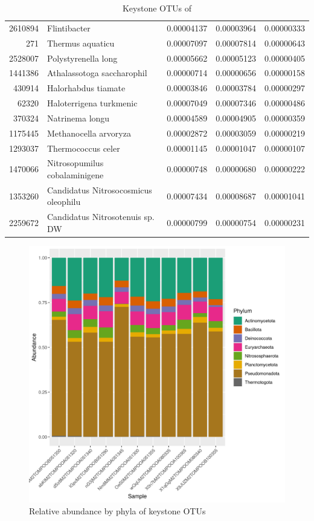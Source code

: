 \begin{table}[ht]
\begin{tabular}{rlrrr}
  2610894 & Flintibacter & 0.00004137 & 0.00003964 & 0.00000333 \\ 
  271 & Thermus aquaticu & 0.00007097 & 0.00007814 & 0.00000643 \\ 
  2528007 & Polystyrenella long & 0.00005662 & 0.00005123 & 0.00000405 \\ 
  1441386 & Athalassotoga saccharophil & 0.00000714 & 0.00000656 & 0.00000158 \\ 
  430914 & Halorhabdus tiamate & 0.00003846 & 0.00003784 & 0.00000297 \\ 
  62320 & Haloterrigena turkmenic & 0.00007049 & 0.00007346 & 0.00000486 \\ 
  370324 & Natrinema longu & 0.00004589 & 0.00004905 & 0.00000359 \\ 
  1175445 & Methanocella arvoryza & 0.00002872 & 0.00003059 & 0.00000219 \\ 
  1293037 & Thermococcus celer & 0.00001145 & 0.00001047 & 0.00000107 \\ 
  1470066 & Nitrosopumilus cobalaminigene & 0.00000748 & 0.00000680 & 0.00000222 \\ 
  1353260 & Candidatus Nitrosocosmicus oleophilu & 0.00007434 & 0.00008687 & 0.00001041 \\ 
  2259672 & Candidatus Nitrosotenuis sp. DW & 0.00000799 & 0.00000754 & 0.00000231 \\ 
   \hline
\end{tabular}
\caption{Keystone OTUs of } 
\end{table}
\begin{figure}
\centering
\includegraphics[scale = 0.8]{tomate_aleatorio1_9.csv_relative_abundance_Phylum.png}
\caption{Relative abundance by phyla of keystone OTUs }
\label{fig:tomate_aleatorio1_9.csv_phyla}
\end{figure}
